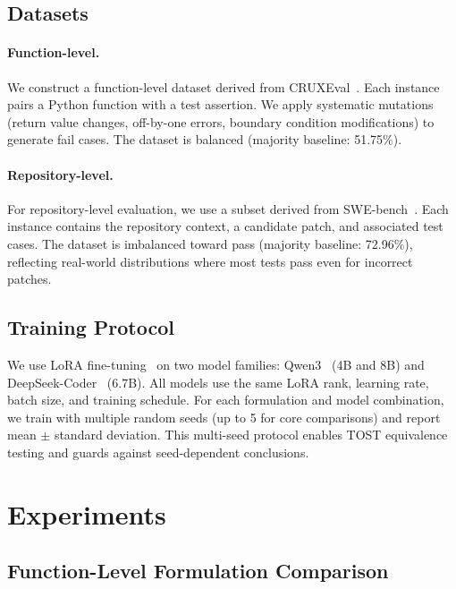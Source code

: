 \documentclass[11pt,a4paper]{article}
\begin{document}
\subsection{Datasets}

\paragraph{Function-level.}
We construct a function-level dataset derived from CRUXEval~\cite{gu2024cruxeval}. Each instance pairs a Python function with a test assertion. We apply systematic mutations (return value changes, off-by-one errors, boundary condition modifications) to generate fail cases. The dataset is balanced (majority baseline: 51.75\%).

\paragraph{Repository-level.}
For repository-level evaluation, we use a subset derived from SWE-bench~\cite{jimenez2024swebench}. Each instance contains the repository context, a candidate patch, and associated test cases. The dataset is imbalanced toward pass (majority baseline: 72.96\%), reflecting real-world distributions where most tests pass even for incorrect patches.

\subsection{Training Protocol}

We use LoRA fine-tuning~\cite{hu2022lora} on two model families: Qwen3~\cite{qwen2025qwen3} (4B and 8B) and DeepSeek-Coder~\cite{guo2024deepseek} (6.7B). All models use the same LoRA rank, learning rate, batch size, and training schedule. For each formulation and model combination, we train with multiple random seeds (up to 5 for core comparisons) and report mean $\pm$ standard deviation. This multi-seed protocol enables TOST equivalence testing and guards against seed-dependent conclusions.

\section{Experiments}

\subsection{Function-Level Formulation Comparison}
\label{sec:func}
\end{document}
